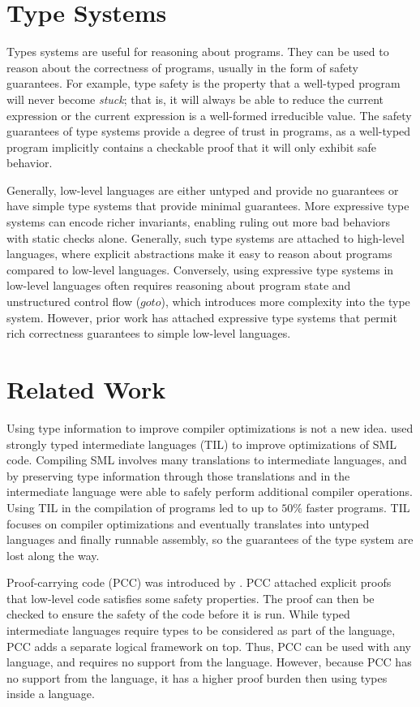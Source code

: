 \section{Type Systems}
Types systems are useful for reasoning about programs.
They can be used to reason about the correctness of programs, usually in the form of safety guarantees.
For example, type safety is the property that a well-typed program will never become \emph{stuck}; that is, it will always be able to reduce the current expression or the current expression is a well-formed irreducible value.
The safety guarantees of type systems provide a degree of trust in programs, as a well-typed program implicitly contains a checkable proof that it will only exhibit safe behavior.

Generally, low-level languages are either untyped and provide no guarantees or have simple type systems that provide minimal guarantees.
More expressive type systems can encode richer invariants, enabling ruling out more bad behaviors with static checks alone.
Generally, such type systems are attached to high-level languages, where explicit abstractions make it easy to reason about programs compared to low-level languages.
Conversely, using expressive type systems in low-level languages often requires reasoning about program state and unstructured control flow (\ie $goto$), which introduces more complexity into the type system.
However, prior work has attached expressive type systems that permit rich correctness guarantees to simple low-level languages.

\section{Related Work}
\label{sec:relwork}
Using type information to improve compiler optimizations is not a new idea.
\citet{TIL} used strongly typed intermediate languages (TIL) to improve optimizations of SML code.
Compiling SML involves many translations to intermediate languages, and by preserving type information through those translations and in the intermediate language \citet{TIL} were able to safely perform additional compiler operations.
Using TIL in the compilation of programs led to up to $50\%$ faster programs.
TIL focuses on compiler optimizations and eventually translates into untyped languages and finally runnable assembly, so the guarantees of the type system are lost along the way.

Proof-carrying code (PCC) was introduced by \citet{PCC}.
PCC attached explicit proofs that low-level code satisfies some safety properties.
The proof can then be checked to ensure the safety of the code before it is run.
While typed intermediate languages require types to be considered as part of the language, PCC adds a separate logical framework on top.
Thus, PCC can be used with any language, and requires no support from the language.
However, because PCC has no support from the language, it has a higher proof burden then using types inside a language.

